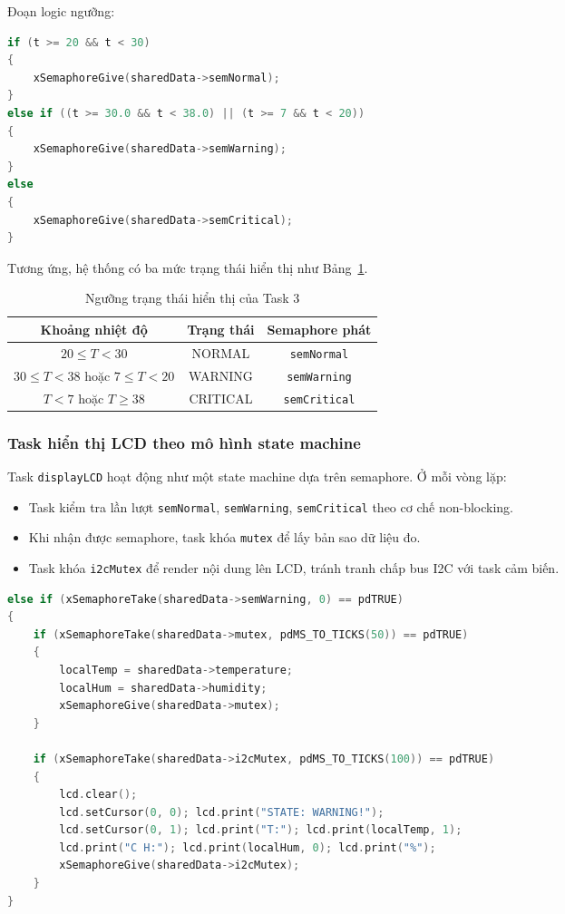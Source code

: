 Đoạn logic ngưỡng:
\begin{lstlisting}[language=c, caption=Phát semaphore theo ngưỡng nhiệt độ (trích temp\_humi.cpp)]
if (t >= 20 && t < 30)
{
    xSemaphoreGive(sharedData->semNormal);
}
else if ((t >= 30.0 && t < 38.0) || (t >= 7 && t < 20))
{
    xSemaphoreGive(sharedData->semWarning);
}
else
{
    xSemaphoreGive(sharedData->semCritical);
}
\end{lstlisting}

Tương ứng, hệ thống có ba mức trạng thái hiển thị như Bảng~\ref{tab:task3-thresholds}.

\begin{table}[h!]
\centering
\caption{Ngưỡng trạng thái hiển thị của Task 3}
\label{tab:task3-thresholds}
\begin{tabular}{|c|c|c|}
\hline
\textbf{Khoảng nhiệt độ} & \textbf{Trạng thái} & \textbf{Semaphore phát} \\
\hline
$20 \leq T < 30$ & NORMAL & \texttt{semNormal} \\
\hline
$30 \leq T < 38$ hoặc $7 \leq T < 20$ & WARNING & \texttt{semWarning} \\
\hline
$T < 7$ hoặc $T \geq 38$ & CRITICAL & \texttt{semCritical} \\
\hline
\end{tabular}
\end{table}

\subsubsection*{Task hiển thị LCD theo mô hình state machine}

Task \texttt{displayLCD} hoạt động như một state machine dựa trên semaphore. Ở mỗi vòng lặp:
\begin{itemize}
    \item Task kiểm tra lần lượt \texttt{semNormal}, \texttt{semWarning}, \texttt{semCritical} theo cơ chế non-blocking.
    \item Khi nhận được semaphore, task khóa \texttt{mutex} để lấy bản sao dữ liệu đo.
    \item Task khóa \texttt{i2cMutex} để render nội dung lên LCD, tránh tranh chấp bus I2C với task cảm biến.
\end{itemize}

\begin{lstlisting}[language=c, caption=Khối xử lý trạng thái WARNING trên LCD (trích display\_lcd.cpp)]
else if (xSemaphoreTake(sharedData->semWarning, 0) == pdTRUE)
{
    if (xSemaphoreTake(sharedData->mutex, pdMS_TO_TICKS(50)) == pdTRUE)
    {
        localTemp = sharedData->temperature;
        localHum = sharedData->humidity;
        xSemaphoreGive(sharedData->mutex);
    }

    if (xSemaphoreTake(sharedData->i2cMutex, pdMS_TO_TICKS(100)) == pdTRUE)
    {
        lcd.clear();
        lcd.setCursor(0, 0); lcd.print("STATE: WARNING!");
        lcd.setCursor(0, 1); lcd.print("T:"); lcd.print(localTemp, 1);
        lcd.print("C H:"); lcd.print(localHum, 0); lcd.print("%");
        xSemaphoreGive(sharedData->i2cMutex);
    }
}
\end{lstlisting}

